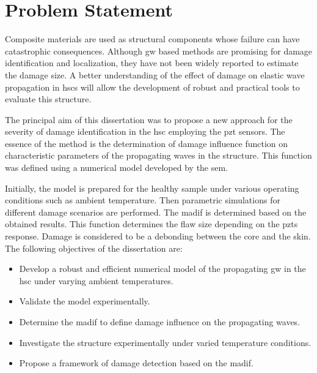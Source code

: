 

\chapter[Problem Statement]{Problem Statement}
\label{ch:problem}



Composite materials are used as structural components whose failure can have catastrophic consequences.
Although \ac{gw} based methods are promising for damage identification and localization, they have not been widely reported to estimate the damage size.
A better understanding of the effect of damage on elastic wave propagation in \acp{hsc} will allow the development of robust and practical tools to evaluate this structure.

The principal aim of this dissertation was to propose a new approach for the severity of damage identification in the \ac{hsc} employing the \ac{pzt} sensors.
The essence of the method is the determination of damage influence function on characteristic parameters of the propagating waves in the structure.
This function was defined using a numerical model developed by the \ac{sem}.

Initially, the model is prepared for the healthy sample under various operating conditions such as ambient temperature.
Then parametric simulations for different damage scenarios are performed.
The \ac{madif} is determined based on the obtained results. 
This function determines the flaw size depending on the \acp{pzt} response.
Damage is considered to be a debonding between the core and the skin. 
The following objectives of the dissertation are:
\begin{itemize}
	\item Develop a robust and efficient numerical model of the propagating \ac{gw} in the \ac{hsc} under varying ambient temperatures.
	\item Validate the model experimentally.
	\item Determine the \ac{madif} to define damage influence on the propagating waves.
	\item Investigate the structure experimentally under varied temperature conditions.
	\item Propose a framework of damage detection based on the \ac{madif}.
\end{itemize}

